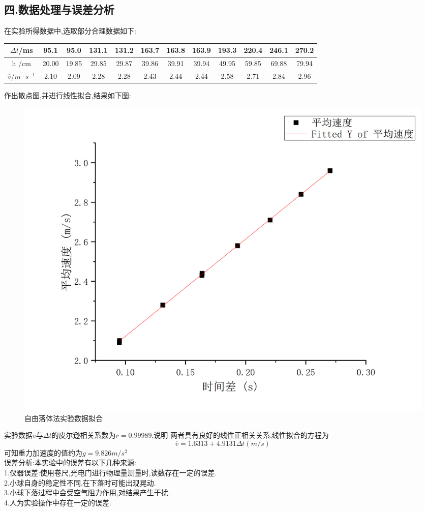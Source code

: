\documentclass[12pt,a4paper,oneside]{ctexart}
\begin{document}
\subsection*{四.数据处理与误差分析}
在实验所得数据中,选取部分合理数据如下:
\begin{center}
    \begin{tabular}{|c|c|c|c|c|c|c|c|c|c|c|c|}
        \hline
        $\Delta t$/ms& 95.1 &95.0&131.1&131.2
                &163.7&163.8&163.9&193.3&220.4&246.1&270.2\\
        \hline
        h /cm &20.00&19.85&29.85&29.87&39.86
                &39.91&39.94&49.95&59.85&69.88&79.94\\
        \hline
        $\overline{v}/m\cdot s^{-1}$ &2.10&2.09&2.28&2.28&2.43&2.44&2.44
        &2.58&2.71&2.84&2.96\\
        \hline
    
    \end{tabular} 
\end{center}
作出散点图,并进行线性拟合,结果如下图:
\begin{figure}[H]
    \centering
    \includegraphics[scale=0.27]{zyltnh.png}
    \caption{自由落体法实验数据拟合}
\end{figure}
实验数据$\overline{v}$与$\Delta t$的皮尔逊相关系数为$r=0.99989$,说明
两者具有良好的线性正相关关系,线性拟合的方程为
$$\overline{v}=1.6313+4.9131\Delta t (m/s)$$
可知重力加速度的值约为$g=9.826m/s^2$\\
误差分析:本实验中的误差有以下几种来源:\\
1.仪器误差:使用卷尺,光电门进行物理量测量时,读数存在一定的误差.\\
2.小球自身的稳定性不同,在下落时可能出现晃动.\\
3.小球下落过程中会受空气阻力作用,对结果产生干扰.\\
4.人为实验操作中存在一定的误差.
\end{document}
